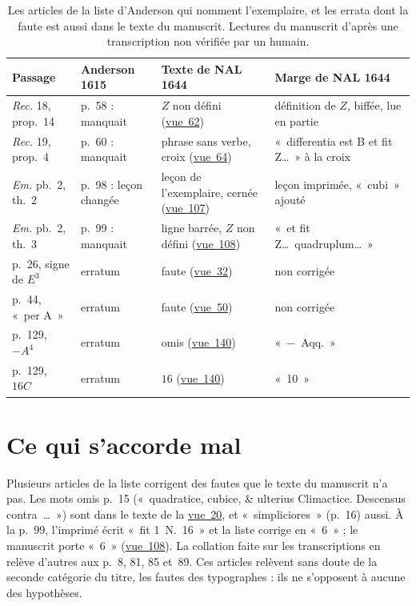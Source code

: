 \documentclass[11pt,a4paper]{article}
\theoremstyle{remark}
\newcommand{\vue}[1]{\href{https://gallica.bnf.fr/ark:/12148/btv1b10033620q/f#1.item}{vue~#1}}
\begin{document}
\begin{table}[ht]
\centering\small
\begin{tabular}{@{}>{\raggedright}p{2.6cm}>{\raggedright}p{2.1cm}>{\raggedright}p{4.1cm}>{\raggedright\arraybackslash}p{4.6cm}@{}}
\toprule
Passage & Anderson 1615 & Texte de NAL 1644 & Marge de NAL 1644\\
\midrule
\emph{Rec.} 18, prop.~14 & p.~58 : manquait & $Z$ non défini (\vue{62}) & définition de $Z$, biffée, lue en partie\\
\emph{Rec.} 19, prop.~4 & p.~60 : manquait & phrase sans verbe, croix (\vue{64}) & «~differentia est B et fit Z\dots~» à la croix\\
\emph{Em.} pb.~2, th.~2 & p.~98 : leçon changée & leçon de l'exemplaire, cernée (\vue{107}) & leçon imprimée, «~cubi~» ajouté\\
\emph{Em.} pb.~2, th.~3 & p.~99 : manquait & ligne barrée, $Z$ non défini (\vue{108}) & «~et fit Z\dots\ quadruplum\dots~»\\
\midrule
p.~26, signe de $E^3$ & erratum & faute (\vue{32}) & non corrigée\\
p.~44, «~per A~» & erratum & faute (\vue{50}) & non corrigée\\
p.~129, $-A^4$ & erratum & omis (\vue{140}) & «~$-$~Aqq.~»\\
p.~129, $16C$ & erratum & $16$ (\vue{140}) & «~10~»\\
\bottomrule
\end{tabular}
\caption{Les articles de la liste d'Anderson qui nomment l'exemplaire, et
les errata dont la faute est aussi dans le texte du manuscrit. Lectures du
manuscrit d'après une transcription non vérifiée par un humain.}
\label{tab:collation}
\end{table}

\section{Ce qui s'accorde mal}\label{sec:desaccords}

Plusieurs articles de la liste corrigent des fautes que le texte du
manuscrit n'a pas. Les mots omis p.~15 («~quadratice, cubice, \& ulterius
Climactice. Descensus contra~\dots~») sont dans le texte de la \vue{20}, et
«~simpliciores~» (p.~16) aussi. À la p.~99, l'imprimé écrit
«~fit 1~N.~16~» et la liste corrige en «~6~» ; le manuscrit porte «~6~»
(\vue{108}). La collation faite sur les transcriptions en relève d'autres
aux p.~8, 81, 85 et~89. Ces articles relèvent sans doute de la seconde
catégorie du titre, les fautes des typographes : ils ne s'opposent à aucune
des hypothèses.
\end{document}
